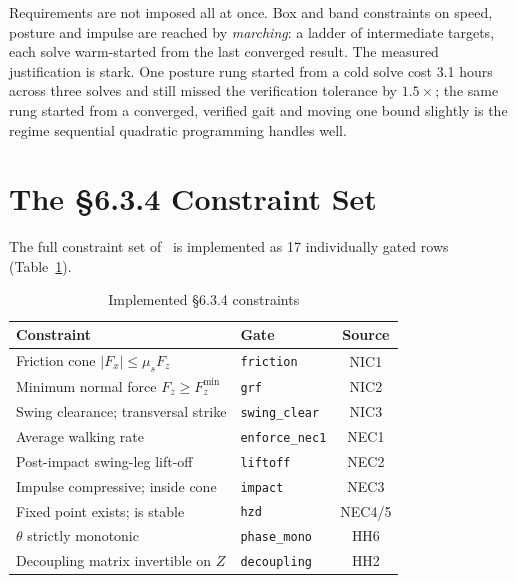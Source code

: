 \documentclass[10pt,conference]{IEEEtran}
\begin{document}
Requirements are not imposed all at once. Box and band constraints on speed,
posture and impulse are reached by \emph{marching}: a ladder of intermediate
targets, each solve warm-started from the last converged result. The measured
justification is stark. One posture rung started from a cold solve cost 3.1
hours across three solves and still missed the verification tolerance by
$1.5\times$; the same rung started from a converged, verified gait and moving
one bound slightly is the regime sequential quadratic programming handles well.

\section{The \S6.3.4 Constraint Set}
\label{sec:constraints}

The full constraint set of~\cite[\S6.3.4]{westervelt2007} is implemented as 17
individually gated rows (Table~\ref{tab:constraints}).

\begin{table}[t]
\caption{Implemented \S6.3.4 constraints}
\label{tab:constraints}
\centering
\begin{tabular}{llc}
\toprule
Constraint & Gate & Source \\
\midrule
Friction cone $|F_x| \le \mu_s F_z$      & \texttt{friction}    & NIC1 \\
Minimum normal force $F_z \ge F_z^{\min}$& \texttt{grf}         & NIC2 \\
Swing clearance; transversal strike      & \texttt{swing\_clear}& NIC3 \\
Average walking rate                     & \texttt{enforce\_nec1} & NEC1 \\
Post-impact swing-leg lift-off           & \texttt{liftoff}     & NEC2 \\
Impulse compressive; inside cone         & \texttt{impact}      & NEC3 \\
Fixed point exists; is stable            & \texttt{hzd}         & NEC4/5 \\
$\theta$ strictly monotonic              & \texttt{phase\_mono} & HH6 \\
Decoupling matrix invertible on $Z$      & \texttt{decoupling}  & HH2 \\
\bottomrule
\end{tabular}
\end{table}
\end{document}
